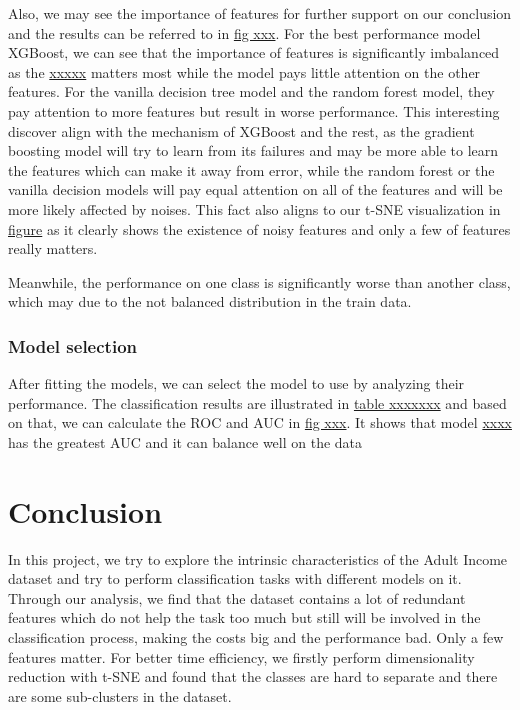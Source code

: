 \documentclass{article}
\begin{document}
Also, we may see the importance of features for further support on our conclusion and the results can be referred to in \underline{fig xxx}. For the best performance model XGBoost, we can see that the importance of features is significantly imbalanced as the \underline{xxxxx} matters most while the model pays little attention on the other features. For the vanilla decision tree model and the random forest model, they pay attention to more features but result in worse performance. This
interesting discover align with the mechanism of XGBoost and the rest, as the gradient boosting model will try to learn from its failures and may be more able to learn the features which can make it away from error, while the random forest or the vanilla decision models will pay equal attention on all of the features and will be more likely affected by noises. This fact also aligns to our t-SNE visualization in \underline{figure} as it clearly shows the existence of noisy features and
only a few of features really matters.

Meanwhile, the performance on one class is significantly worse than another class, which may due to the not balanced distribution in the train data.

\subsubsection*{Model selection}

After fitting the models, we can select the model to use by analyzing their performance. The classification results are illustrated in \underline{table xxxxxxx} and based on that, we can calculate the ROC and AUC in \underline{fig xxx}. It shows that model \underline{xxxx} has the greatest AUC and it can balance well on the data


\section{Conclusion}

In this project, we try to explore the intrinsic characteristics of the Adult Income dataset and try to perform classification tasks with different models on it. Through our analysis, we find that the dataset contains a lot of redundant features which do not help the task too much but still will be involved in the classification process, making the costs big and the performance bad. Only a few features matter. For better time efficiency, we firstly perform dimensionality reduction
with t-SNE and found that the classes are hard to separate and there are some sub-clusters in the dataset. 
\end{document}

